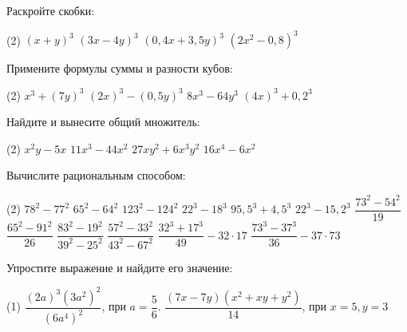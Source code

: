 \begin{class}[number=2]
	\begin{listofex}
		\item Раскройте скобки:
		\begin{tasks}(2)
			\task \( (x+y)^3 \)
			\task \( (3x-4y)^3 \)
			\task \( (0,4x+3,5y)^3 \)
			\task \( (2x^2-0,8)^3 \)
		\end{tasks}
		\item Примените формулы суммы и разности кубов:
		\begin{tasks}(2)
			\task \( x^3+(7y)^3 \)
			\task \( (2x)^3-(0,5y)^3 \)
			\task \( 8x^3-64y^3 \)
			\task \( (4x)^3+0,2^3 \)
		\end{tasks}
		\item Найдите и вынесите общий множитель:
		\begin{tasks}(2)
			\task \( x^2y-5x \)
			\task \( 11x^3-44x^2 \)
			\task \( 27xy^2+6x^3y^2 \)
			\task \( 16x^4-6x^2 \)
		\end{tasks}
		\item Вычислите рациональным способом:
		\begin{tasks}(2)
			\task \( 78^2-77^2 \)
			\task \( 65^2-64^2 \)
			\task \( 123^2-124^2 \)
			\task \( 22^3-18^3 \)
			\task \( 95,5^3+4,5^3 \)
			\task \( 22^3-15,2^3 \)
			\task \( \dfrac{73^2-54^2}{19} \)
			\task \( \dfrac{65^2-91^2}{26} \)
			\task \( \dfrac{83^2-19^2}{39^2-25^2} \)
			\task \( \dfrac{57^2-33^2}{43^2-67^2} \)
			\task \( \dfrac{32^3+17^3}{49}-32\cdot17 \)
			\task \( \dfrac{73^3-37^3}{36}-37\cdot73 \)
		\end{tasks}
		\item Упростите выражение и найдите его значение:
		\begin{tasks}(1)
			\task \( \dfrac{(2a)^3(3a^2)^2}{(6a^4)^2} \), при \(a=\dfrac{5}{6}\).
			\task \( \dfrac{(7x-7y)(x^2+xy+y^2)}{14} \), при \( x=5, y=3 \)
		\end{tasks}
	\end{listofex}
\end{class}

